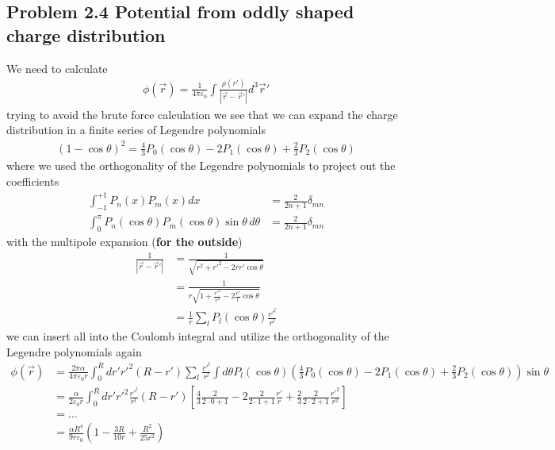\documentclass[../main.tex]{subfiles}
\begin{document}
\subsection{Problem 2.4 Potential from oddly shaped charge distribution}
We need to calculate
\begin{align}
\phi(\vec{r})=\frac{1}{4\pi\varepsilon_0}\int\frac{\rho(r')}{|\vec{r}-\vec{r}'|}d^3\vec{r}'
\end{align}
trying to avoid the brute force calculation we see that we can expand the charge distribution in a finite series of Legendre polynomials
\begin{align}
(1-\cos\theta)^2=\frac{4}{3}P_0(\cos\theta)-2P_1(\cos\theta)+\frac{2}{3}P_2(\cos\theta)
\end{align}
where we used the orthogonality of the Legendre polynomials to project out the coefficients 
\begin{align}
\int_{-1}^{+1}P_n(x)P_m(x)dx&=\frac{2}{2n+1}\delta_{mn}\\
\int_{0}^{\pi}P_n(\cos\theta)P_m(\cos\theta)\sin\theta\,d\theta&=\frac{2}{2n+1}\delta_{mn}
\end{align}
with the multipole expansion ({\bf for the outside})
\begin{align}
\frac{1}{|\vec{r}-\vec{r}'|}
&=\frac{1}{\sqrt{r^2+r'^2-2rr'\cos\theta}}\\
&=\frac{1}{r\sqrt{1+\frac{r'^2}{r^2}-2\frac{r'}{r}\cos\theta}}\\
&=\frac{1}{r}\sum_lP_l(\cos\theta)\frac{r'^l}{r^l}
\end{align}
we can insert all into the Coulomb integral and utilize the orthogonality of the Legendre polynomials again
\begin{align}
\phi(\vec{r})
&=\frac{2\pi\alpha}{4\pi\varepsilon_0r}\int_0^R dr'r'^2(R-r')\sum_l\frac{r'^l}{r^l}\int d\theta P_l(\cos\theta)\left(\frac{4}{3}P_0(\cos\theta)-2P_1(\cos\theta)+\frac{2}{3}P_2(\cos\theta)\right)\sin\theta\\
&=\frac{\alpha}{2\varepsilon_0r}\int_0^R dr'r'^2\frac{r'^l}{r^l}(R-r')\left[\frac{4}{3}\frac{2}{2\cdot0+1}-2\frac{2}{2\cdot1+1}\frac{r'}{r}+\frac{2}{3}\frac{2}{2\cdot2+1}\frac{r'^2}{r^2}\right]\\
&=...\\
&=\frac{\alpha R^4}{9r\varepsilon_0}\left(1-\frac{3R}{10r}+\frac{R^2}{25r^2}\right)
\end{align}
\end{document}

